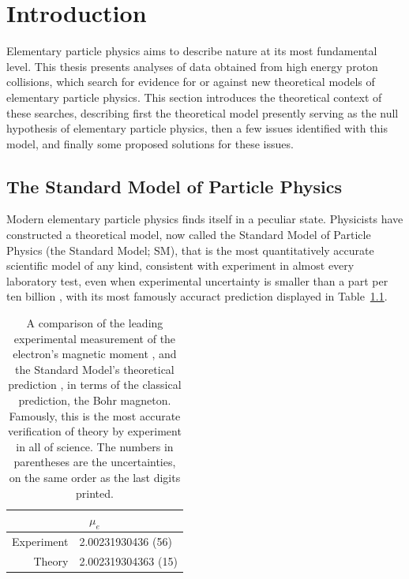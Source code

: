 \chapter{Introduction}

Elementary particle physics aims to describe nature at its most fundamental level.
This thesis presents analyses of data obtained from high energy proton collisions, which search for evidence for or against new theoretical models of elementary particle physics.
This section introduces the theoretical context of these searches, describing first the theoretical model presently serving as the null hypothesis of elementary particle physics, then a few issues identified with this model, and finally some proposed solutions for these issues.

\section{The Standard Model of Particle Physics} \label{sec:standardmodel}

Modern elementary particle physics finds itself in a peculiar state.
Physicists have constructed a theoretical model, now called the Standard Model of Particle Physics (the Standard Model; SM), that is the most quantitatively accurate scientific model of any kind, consistent with experiment in almost every laboratory test, even when experimental uncertainty is smaller than a part per ten billion \cite{electronmu_exp,electronmu_th}, with its most famously accuract prediction displayed in Table~\ref{tab:electronmu}.
\begin{table}
\centering
\begin{tabular}{r l}
\multicolumn{2}{c}{$\mu_e$} \\
\hline
Experiment & 2.00231930436 (56) \\
Theory & 2.002319304363 (15)
\end{tabular}
\caption[Comparison of theoretical prediction and experimental measurement of the electron magnetic moment.]
        {A comparison of the leading experimental measurement of the electron's magnetic moment \cite{electronmu_exp}, and the Standard Model's theoretical prediction \cite{electronmu_th}, in terms of the classical prediction, the Bohr magneton. 
          Famously, this is the most accurate verification of theory by experiment in all of science. 
          The numbers in parentheses are the uncertainties, on the same order as the last digits printed.}
\label{tab:electronmu}
\end{table}


